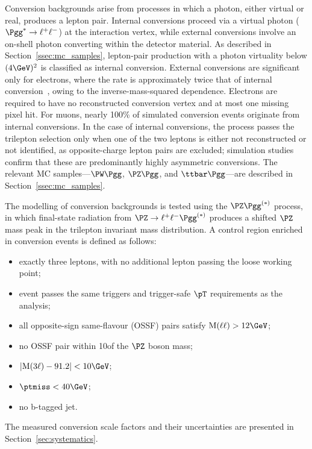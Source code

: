 Conversion backgrounds arise from processes in which a photon, either virtual or real, produces a lepton pair. Internal conversions proceed via a virtual photon ($\Pgg^{*} \to \ell^{+}\ell^{-}$) at the interaction vertex, while external conversions involve an on-shell photon converting within the detector material. As described in Section~\ref{ssec:mc_samples}, lepton-pair production with a photon virtuality below $(4\GeV)^{2}$ is classified as internal conversion. External conversions are significant only for electrons, where the rate is approximately twice that of internal conversion~\cite{ExtConv}, owing to the inverse-mass-squared dependence. Electrons are required to have no reconstructed conversion vertex and at most one missing pixel hit. For muons, nearly 100\% of simulated conversion events originate from internal conversions. In the case of internal conversions, the process passes the trilepton selection only when one of the two leptons is either not reconstructed or not identified, as opposite-charge lepton pairs are excluded; simulation studies confirm that these are predominantly highly asymmetric conversions. The relevant MC samples---$\PW\Pgg$, $\PZ\Pgg$, and $\ttbar\Pgg$---are described in Section~\ref{ssec:mc_samples}.

The modelling of conversion backgrounds is tested using the $\PZ\Pgg^{(*)}$ process, in which final-state radiation from $\PZ \to \ell^{+}\ell^{-}\Pgg^{(*)}$ produces a shifted $\PZ$ mass peak in the trilepton invariant mass distribution. A control region enriched in conversion events is defined as follows:
\begin{itemize}
  \item exactly three leptons, with no additional lepton passing the loose working point;
  \item event passes the same triggers and trigger-safe $\pT$ requirements as the analysis;
  \item all opposite-sign same-flavour (OSSF) pairs satisfy $\mathrm{M}(\ell\ell) > 12\GeV$;
  \item no OSSF pair within 10\GeV of the $\PZ$ boson mass;
  \item $|\mathrm{M}(3\ell) - 91.2| < 10\GeV$;
  \item $\ptmiss < 40\GeV$;
  \item no b-tagged jet.
\end{itemize}
The measured conversion scale factors and their uncertainties are presented in Section~\ref{sec:systematics}.

